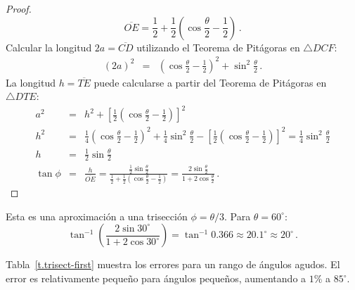\begin{proof}
\[
\overline{OE}=\frac{1}{2} + \frac{1}{2}\left(\cos \frac{\theta}{2}-\frac{1}{2}\right)\,.
\]
Calcular la longitud $2a=\overline{CD}$ utilizando el Teorema de Pitágoras en $\triangle DCF$:
\begin{eqnarray*}
(2a)^2 &=&  \left(\cos \frac{\theta}{2}-\frac{1}{2}\right)^2+\sin^2\frac{\theta}{2}\,.
\end{eqnarray*}
La longitud $h=\overline{TE}$ puede calcularse a partir del Teorema de Pitágoras en $\triangle DTE$:
\begin{eqnarray*}
a^2 &=& h^2 + \left[\frac{1}{2}\left(\cos \frac{\theta}{2}-\frac{1}{2}\right)\right]^2\\
h^2&=&\frac{1}{4}\left(\cos \frac{\theta}{2}-\frac{1}{2}\right)^2+\frac{1}{4}\sin^2\frac{\theta}{2}-\left[\frac{1}{2}\left(\cos \frac{\theta}{2}-\frac{1}{2}\right)\right]^2=
\frac{1}{4}\sin^2\frac{\theta}{2}\\
h&=&\frac{1}{2}\sin\frac{\theta}{2}\\
\tan\phi &=&\frac{h}{\overline{OE}}=\displaystyle\frac{\displaystyle\frac{1}{2}\sin\frac{\theta}{2}}{\displaystyle\frac{1}{2}+\frac{1}{2}\left(\cos \frac{\theta}{2}\! -\! \frac{1}{2}\right)}
=\frac{\displaystyle2\sin\frac{\theta}{2}}{\displaystyle 1+2\cos\frac{\theta}{2}}\,.
\end{eqnarray*}                  
\end{proof}

Esta es una aproximación a una trisección $\phi=\theta/3$. Para $\theta=60^\circ$:
\[
\tan^{-1}\left(\frac{2\sin 30^\circ}{1+2\cos 30^\circ}\right)=
\tan^{-1}0.366\approx 20.1^\circ\approx 20^\circ\,.
\]

Tabla~\ref{t.trisect-first} muestra los errores para un rango de ángulos agudos. El error es relativamente pequeño para ángulos pequeños, aumentando a $1\%$ a $85^\circ$.

